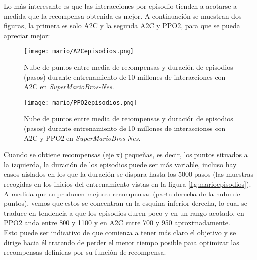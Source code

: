 \documentclass[11pt,fleqn]{book} %
\begin{document}
Lo más interesante es que las interacciones por episodio tienden a acotarse a medida que la recompensa obtenida es mejor. A continuación se muestran dos figuras, la primera es solo A2C y la segunda A2C y PPO2, para que se pueda apreciar mejor:

\newpage

\begin{figure}[H]
	\centering\texttt{[image: mario/A2Cepisodios.png]}
	\caption{Nube de puntos entre media de recompensas y duración de episodios (pasos) durante entrenamiento de 10 millones de interacciones con A2C en \textit{SuperMarioBros-Nes}.}
	\label{fig:marioA2Cepisodios} %
\end{figure}

\begin{figure}[H]
	\centering\texttt{[image: mario/PPO2episodios.png]}
	\caption{Nube de puntos entre media de recompensas y duración de episodios (pasos) durante entrenamiento de 10 millones de interacciones con A2C y PPO2 en \textit{SuperMarioBros-Nes}.}
	\label{fig:marioPPO2episodios} %
\end{figure}

Cuando se obtiene recompensas (eje x) pequeñas, es decir, los puntos situados a la izquierda, la duración de los episodios puede ser más variable, incluso hay casos aislados en los que la duración se dispara hasta los 5000 pasos (las muestras recogidas en los inicios del entrenamiento vistas en la figura \ref{fig:marioepisodios}). \\

A medida que se producen mejores recompensas (parte derecha de la nube de puntos), vemos que estos se concentran en la esquina inferior derecha, lo cual se traduce en tendencia a que los episodios duren poco y en un rango acotado, en PPO2 anda entre 800 y 1100 y en A2C entre 700 y 950 aproximadamente. \\

Esto puede ser indicativo de que comienza a tener más claro el objetivo y se dirige hacia él tratando de perder el menor tiempo posible para optimizar las recompensas definidas por su función de recompensa. \\
\end{document}
